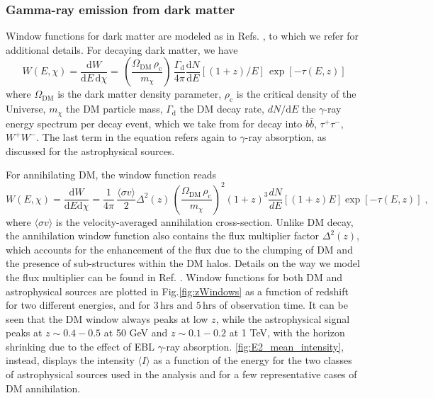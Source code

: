 \documentclass[aps,prd,a4paper,reprint,nofootinbib,superscriptaddress,floatfix,preprintnumbers]{revtex4-2}
\newcommand{\de}{\textrm{d}}
\newcommand{\be}{\begin{equation}}
\newcommand{\ee}{\end{equation}}
\let\Gamma\varGamma
\let\Delta\varDelta
\let\Omega\varOmega
\begin{document}
\subsubsection{Gamma-ray emission from dark matter}
\label{app:WDM}

Window functions for dark matter are modeled as in Refs. \cite{Camera_2015,Fornengo:2013rga,Cuoco:2015rfa}, to which we refer for additional details. For decaying dark matter, we have
%
 \be
     W(E, \chi) = \frac{\de W}{\de E\,\de\chi} = \, \left (\frac{\Omega_\textrm{DM} \,\rho_\textrm{c} }{m_{\chi}} \right) \, \frac{\Gamma_\textrm{d}}{4 \pi}  \frac{\de N}{\de E}[(1+z)/E] \, \exp[-\tau(E,z)]
     \label{eqn:Wann}
 \ee
%
where $\Omega_\textrm{DM}$ is the dark matter density parameter, $\rho_\textrm{c}$ is the critical density of the Universe,
$m_{\chi}$ the DM particle mass, $\Gamma_\textrm{d}$ the DM decay rate, $dN/\de E$ the $\gamma$-ray energy spectrum per decay event, which we take from \cite{Arina:2023eic} for decay into $b\bar{b}$, $\tau^+ \tau^-$, $W^+ W^-$. The last term in the equation refers again to $\gamma$-ray absorption, as discussed for the astrophysical sources.


For annihilating DM, the window function reads
%
 \be
     W(E, \chi) = \frac{\de W}{\de E\de\chi} = \frac{1}{4 \pi} \, \frac{\langle \sigma v \rangle}{2} \Delta^2(z) \, \left (\frac{\Omega_\textrm{DM} \,\rho_\textrm{c} }{m_{\chi}} \right)^2 (1+z)^3  \frac{d N}{d E}[(1+z)E]  \exp[-\tau(E,z)]\;,
     \label{eqn:Wann}
 \ee
%
where  $\langle \sigma v \rangle$ is the velocity-averaged annihilation cross-section. Unlike DM decay, the annihilation window function also contains the flux multiplier factor $\Delta^2(z)$, which accounts for the enhancement of the flux due to the clumping of DM and the presence of sub-structures within the DM halos. Details on the way we model the flux multiplier can be found in Ref. \cite{Pinetti:2021jjs,Pinetti:2019ztr,Arcari:2022zul}.
Window functions for both DM and astrophysical sources are plotted in Fig.\ref{fig:zWindows} as a function of redshift for two different energies, and for $3\,\mathrm{hrs}$ and $5\,\mathrm{hrs}$ of observation time. It can be seen that the DM window always peaks at low $z$, while the astrophysical signal peaks at $z\sim 0.4-0.5$ at 50 GeV and  $z\sim 0.1-0.2$ at 1 TeV, with the horizon shrinking due to the effect of EBL $\gamma$-ray absorption.
\cref{fig:E2_mean_intensity}, instead, displays the intensity $\langle I \rangle$ as a function of the energy for the two classes of astrophysical sources used in the analysis and for a few representative cases of DM annihilation. 
\end{document}
